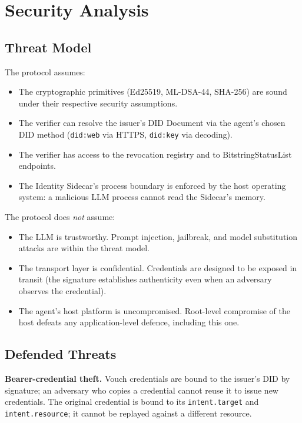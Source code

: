 \documentclass[11pt,a4paper]{article}
\begin{document}
\section{Security Analysis}
\label{sec:security}

\subsection{Threat Model}

The protocol assumes:

\begin{itemize}[leftmargin=*]
\item The cryptographic primitives (Ed25519, ML-DSA-44, SHA-256) are sound under their respective security assumptions.
\item The verifier can resolve the issuer's DID Document via the agent's chosen DID method (\texttt{did:web} via HTTPS, \texttt{did:key} via decoding).
\item The verifier has access to the revocation registry and to BitstringStatusList endpoints.
\item The Identity Sidecar's process boundary is enforced by the host operating system: a malicious LLM process cannot read the Sidecar's memory.
\end{itemize}

The protocol does \emph{not} assume:

\begin{itemize}[leftmargin=*]
\item The LLM is trustworthy. Prompt injection, jailbreak, and model substitution attacks are within the threat model.
\item The transport layer is confidential. Credentials are designed to be exposed in transit (the signature establishes authenticity even when an adversary observes the credential).
\item The agent's host platform is uncompromised. Root-level compromise of the host defeats any application-level defence, including this one.
\end{itemize}

\subsection{Defended Threats}

\noindent\textbf{Bearer-credential theft.} Vouch credentials are bound to the issuer's DID by signature; an adversary who copies a credential cannot reuse it to issue new credentials. The original credential is bound to its \verb|intent.target| and \verb|intent.resource|; it cannot be replayed against a different resource.
\end{document}
